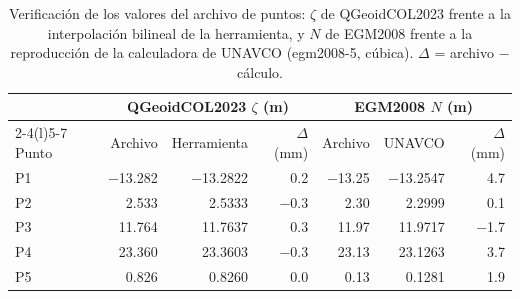 \documentclass[11pt,letterpaper]{article}
\begin{document}
\begin{table}[H]
\centering
\footnotesize
\setlength{\tabcolsep}{3pt}
\renewcommand{\arraystretch}{0.9}
\caption{Verificación de los valores del archivo de puntos: $\zeta$ de QGeoidCOL2023 frente a la
interpolación bilineal de la herramienta, y $N$ de EGM2008 frente a la reproducción de la
calculadora de UNAVCO (egm2008-5, cúbica). $\Delta$ = archivo $-$ cálculo.}
\label{tab:verif}
\begin{tabular}{@{}lrrrrrr@{}}
\toprule
& \multicolumn{3}{c}{QGeoidCOL2023 $\zeta$ (m)} & \multicolumn{3}{c}{EGM2008 $N$ (m)} \\
\cmidrule(lr){2-4}\cmidrule(l){5-7}
Punto & Archivo & Herramienta & $\Delta$ (mm) & Archivo & UNAVCO & $\Delta$ (mm) \\
\midrule
P1 & \num{-13.282} & \num{-13.2822} & \num{0.2} & \num{-13.25} & \num{-13.2547} & \num{4.7} \\
P2 & \num{2.533} & \num{2.5333} & \num{-0.3} & \num{2.30} & \num{2.2999} & \num{0.1} \\
P3 & \num{11.764} & \num{11.7637} & \num{0.3} & \num{11.97} & \num{11.9717} & \num{-1.7} \\
P4 & \num{23.360} & \num{23.3603} & \num{-0.3} & \num{23.13} & \num{23.1263} & \num{3.7} \\
P5 & \num{0.826} & \num{0.8260} & \num{0.0} & \num{0.13} & \num{0.1281} & \num{1.9} \\
\bottomrule
\end{tabular}
\end{table}
\end{document}
